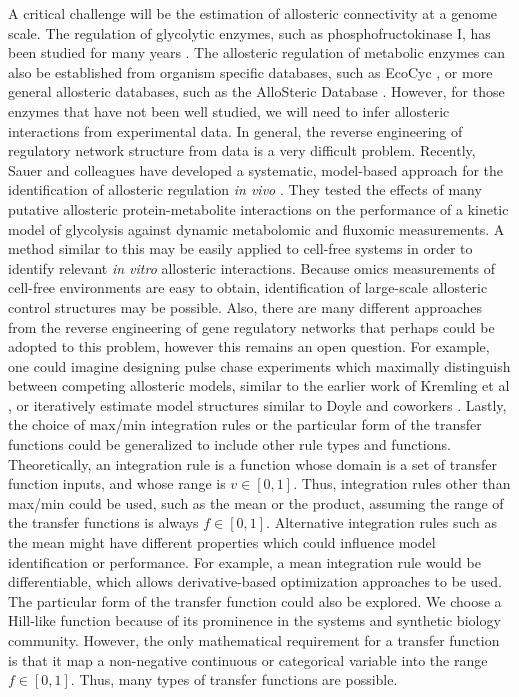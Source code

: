 \documentclass[12pt]{article}
\begin{document}
A critical challenge will be the estimation of allosteric connectivity at a genome scale. 
The regulation of glycolytic enzymes, such as phosphofructokinase I, has been studied for many years \citep{BERG_BIOCHEMISTRY,Peskov:2008aa}. 
The allosteric regulation of metabolic enzymes can also be established from organism specific databases, such as EcoCyc \citep{Keseler:2013aa}, 
or more general allosteric databases, such as the AlloSteric Database \citep{Huang:2014aa}. 
However, for those enzymes that have not been well studied, we will need to infer allosteric interactions from experimental data.
In general, the reverse engineering of regulatory network structure from data is a very difficult problem. 
Recently, Sauer and colleagues have developed a systematic, model-based approach for the identification of allosteric regulation \textit{in vivo} \cite{Link:2013aa}. 
They tested the effects of many putative allosteric protein-metabolite interactions on the performance of a kinetic model of glycolysis against dynamic metabolomic and fluxomic measurements. 
A method similar to this may be easily applied to cell-free systems in order to identify relevant \textit{in vitro} allosteric interactions. 
Because omics measurements of cell-free environments are easy to obtain, identification of large-scale allosteric control structures may be possible. 
Also, there are many different approaches from the reverse engineering of gene regulatory networks that perhaps could be adopted to this problem, however this remains an open question.
For example, one could imagine designing pulse chase experiments which maximally distinguish between competing allosteric models, similar to the earlier work of Kremling et al \citep{Kremling:2004aa}, or
iteratively estimate model structures similar to Doyle and coworkers \citep{Gadkar:2005aa}.
Lastly, the choice of max/min integration rules or the particular form of the transfer functions could be generalized to include other rule types and functions. 
Theoretically, an integration rule is a function whose domain is a set of transfer function inputs, and whose range is $v\in[0,1]$.
Thus, integration rules other than max/min could be used, such as the mean or the product, assuming the range of the transfer functions is always $f\in[0,1]$.
Alternative integration rules such as the mean might have different properties which could influence model identification or performance. 
For example, a mean integration rule would be differentiable, which allows derivative-based optimization approaches to be used. 
The particular form of the transfer function could also be explored. We choose a Hill-like function because of its 
prominence in the systems and synthetic biology community. However, the only mathematical requirement for a transfer function is that it map a non-negative continuous or categorical variable into the 
range $f\in[0,1]$. Thus, many types of transfer functions are possible.
\end{document}

